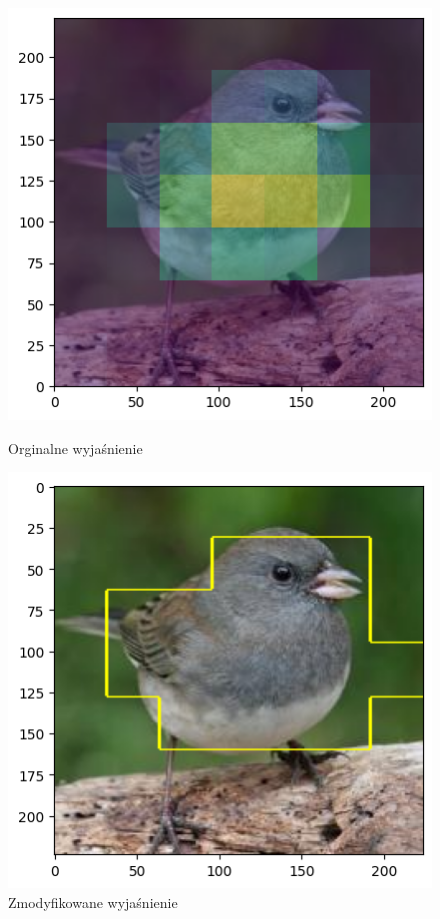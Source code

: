 \begin{figure}
	\centering
	\begin{minipage}[b]{0.3\textwidth}
		\includegraphics[width=.9\textwidth]{img/parameters/gradcam/threshold_base}
		\caption{Orginalne wyjaśnienie}  \label{rys:parameters_lime_numsamples_5}
	\end{minipage}
	\begin{minipage}[b]{0.3\textwidth}
		\centering\includegraphics[width=.9\textwidth]{img/parameters/gradcam/threshold_01}
		\caption{Zmodyfikowane wyjaśnienie}  \label{rys:parameters_lime_numsamples_1000}
	\end{minipage}
\end{figure}
